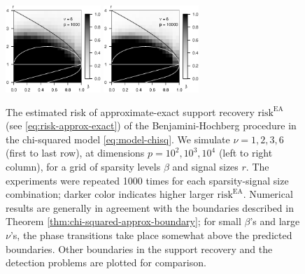 \begin{figure}
      \includegraphics[width=0.32\textwidth]{./sim_approx-exact_boundary/simulated_approx-exact_boundary_chi-squared_nu6_p1000.eps}
      \includegraphics[width=0.32\textwidth]{./sim_approx-exact_boundary/simulated_approx-exact_boundary_chi-squared_nu6_p10000.eps}
      \caption{The estimated risk of approximate-exact support recovery $\mathrm{risk}^{\mathrm{EA}}$ (see \eqref{eq:risk-approx-exact}) of the Benjamini-Hochberg procedure in the chi-squared model \eqref{eq:model-chisq}. 
      We simulate $\nu=1, 2, 3, 6$ (first to last row), at dimensions $p=10^2, 10^3, 10^4$ (left to right column), for a grid of sparsity levels $\beta$ and signal sizes $r$.
      The experiments were repeated 1000 times for each sparsity-signal size combination; darker color indicates higher larger $\mathrm{risk}^{\mathrm{EA}}$. 
      Numerical results are generally in agreement with the boundaries described in Theorem \ref{thm:chi-squared-approx-boundary}; for small $\beta$'s and large $\nu$'s, the phase transitions take place somewhat above the predicted boundaries.
      Other boundaries in the support recovery and the detection problems are plotted for comparison.} 
      \label{fig:phase-simulated-chi-squared-approx-exact-boundary}
\end{figure}
